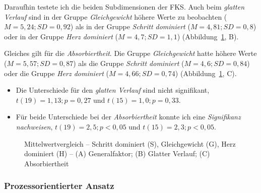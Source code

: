 Daraufhin testete ich die beiden Subdimensionen der \ac{FKS}. Auch beim \emph{glatten Verlauf} sind in der Gruppe \emph{Gleichgewicht} höhere Werte zu beobachten ($M = 5{,}24; SD = 0{,}92$) als in der Gruppe \emph{Schritt dominiert} ($M = 4{,}81; SD = 0{,}8$) oder in der Gruppe \emph{Herz dominiert} ($M = 4{,}7; SD = 1{,}1$) (Abbildung~\ref{fig:mittelwert_vergleich}, B). 

Gleiches gilt für die \emph{Absorbiertheit}. Die Gruppe \emph{Gleichgewicht} hatte höhere Werte ($M = 5{,}57; SD = 0{,}87$) als die Gruppe \emph{Schritt dominiert} ($M = 4{,}6; SD = 0{,}84$) oder die Gruppe \emph{Herz dominiert} ($M = 4{,}66; SD = 0{,}74$) (Abbildung~\ref{fig:mittelwert_vergleich}, C).
\begin{itemize}
	
	\item Die Unterschiede für den \emph{glatten Verlauf} sind nicht signifikant, $t(19) = 1{,}13; p = 0{,}27$ und $t(15) = 1{,}0; p = 0{,}33$.
	
	\item Für beide Unterschiede bei der \emph{Absorbiertheit} konnte ich eine \emph{Signifikanz nachweisen}, $t(19) = 2{,}5; p < 0{,}05$ und $t(15) = 2{,}3; p < 0{,}05$.
\end{itemize}
\begin{figure}
	[thb!]  \caption[Mittelwertvergleich -- Schritt dominiert, Gleichgewicht, Herz dominiert]{Mittelwertvergleich -- Schritt dominiert (S), Gleichgewicht (G), Herz dominiert (H) -- (A) Generalfaktor; (B) Glatter Verlauf; (C) Absorbiertheit} \label{fig:mittelwert_vergleich} 
\end{figure}

\subsubsection{Prozessorientierter Ansatz} 

\label{ssub:prozessorientierter_ansatz_5_3}

